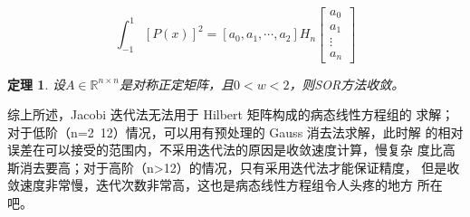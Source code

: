 \documentclass[a4paper]{article}
\newtheorem{theorem}{\hspace{2em}定理}[section]
\begin{document}
\begin{equation}\label{eq:1}
\int_{-1}^{1}[P(x)]^2=[a_0,a_1,\cdots,a_2]H_n\left[
\begin{array}{c}
a_0 \\
a_1 \\
\vdots \\
a_n
\end{array}
\right]
\end{equation}

\begin{theorem}
	\label{theorem1}
	设$A\in \mathbb{R}^{n\times n}$是对称正定矩阵，且$0<w<2$，则SOR方法收敛。
\end{theorem}

综上所述，Jacobi 迭代法无法用于 Hilbert 矩阵构成的病态线性方程组的
求解；对于低阶（n=2~12）情况，可以用有预处理的 Gauss 消去法求解，此时解
的相对误差在可以接受的范围内，不采用迭代法的原因是收敛速度计算，慢复杂
度比高斯消去要高；对于高阶（n>12）的情况，只有采用迭代法才能保证精度，
但是收敛速度非常慢，迭代次数非常高，这也是病态线性方程组令人头疼的地方
所在吧。
\end{document}
